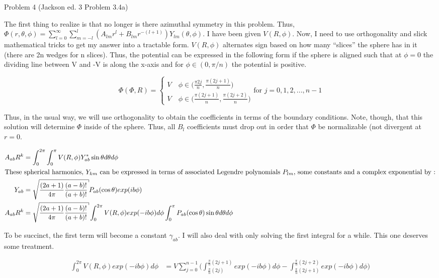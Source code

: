 \begin{homeworkProblem}{Problem 4 (Jackson ed. 3 Problem 3.4a)}

The first thing to realize is that no longer is there azimuthal symmetry in this problem. Thus, $\Phi(r,\theta,\phi) = \sum\limits_{l=0}^\infty \sum\limits_{m=-l}^l (A_{lm} r^l + B_{lm} r^{-(l+1)})Y_{lm}(\theta,\phi)$. I have been given $V(R,\phi)$. Now, I need to use orthogonality and slick mathematical tricks to get my answer into a tractable form. $V(R,\phi)$ alternates sign based on how many ``slices'' the sphere has in it (there are 2n wedges for n slices). Thus, the potential can be expressed in the following form if the sphere is aligned such that at $\phi = 0$ the dividing line between V and -V is along the x-axis and for $\phi \in (0,\pi/n)$ the potential is positive.

\[
\Phi(\Phi,R) =
\begin{cases}
V \quad \phi \in \big(\frac{\pi 2j}{n},\frac{\pi (2j+1)}{n}\big) \\
V \quad \phi \in \big(\frac{\pi (2j+1)}{n},\frac{\pi (2j+2)}{n}\big)
\end{cases}
\text{for $j = 0,1,2,...,n-1$}
\]

Thus, in the usual way, we will use orthogonality to obtain the coefficients in terms of the boundary conditions. Note, though, that this solution will determine $\Phi$ inside of the sphere. Thus, all $B_l$ coefficients must drop out in order that $\Phi$ be normalizable (not divergent at $r=0$.

\begin{align}
	A_{ab} R^k &= \int_0^{2\pi}\int_0^\pi V(R,\phi) Y_{ab}^* \sin\theta d\theta d\phi \nonumber \\
	\intertext{These spherical harmonics, $Y_{km}$ can be expressed in terms of associated Legendre polynomials $P_{lm}$, some constants and a complex exponential by :} \nonumber
	Y_{ab} &= \sqrt{\frac{(2a+1)}{4\pi}\frac{(a-b)!}{(a+b)!}} P_{ab}(\cos\theta) exp(i b\phi) \nonumber \\
	A_{ab} R^k &= \sqrt{\frac{(2a+1)}{4\pi}\frac{(a-b)!}{(a+b)!}} \int_0^{2\pi} V(R,\phi) exp(-i b\phi) d\phi \int_0^\pi  P_{ab}(\cos\theta)\sin\theta d\theta d\phi
\end{align}

To be succinct, the first term will become a constant $\gamma_{ab}$. I will also deal with only solving the first integral for a while. This one deserves some treatment.

\begin{align}
  \int_0^{2\pi} V(R,\phi) exp(-i b\phi) d\phi &= V\sum_{j=0}^{n-1} \Big( \int_{\frac{\pi}{n}(2j)}^{\frac{\pi}{n}(2j+1)} exp(-i b\phi) d\phi - \int_{\frac{\pi}{n}(2j+1)}^{\frac{\pi}{n}(2j+2)} exp(-i b\phi) d\phi \Big) \nonumber
\end{align}


\end{homeworkProblem}
